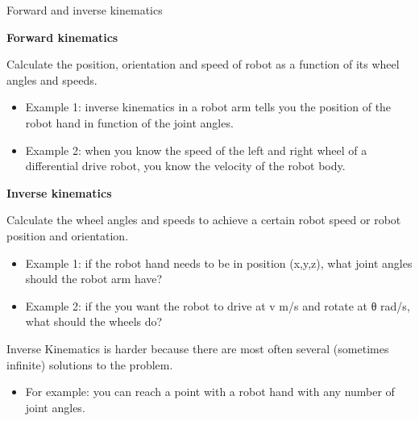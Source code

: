 \documentclass[compress]{beamer}
\begin{document}
\begin{frame}{Forward and inverse kinematics}

\textbf{Forward kinematics}

Calculate the position, orientation and speed of robot as a function of
its wheel angles and speeds.

\begin{itemize}
    \item Example 1: inverse kinematics in a robot arm tells you the position of
  the robot hand in function of the joint angles.
    \item Example 2: when you know the speed of the left and right wheel of a
  differential drive robot, you know the velocity of the robot body.
\end{itemize}

\textbf{Inverse kinematics}

Calculate the wheel angles and speeds to achieve a certain robot speed
or robot position and orientation.

\begin{itemize}
    \item Example 1: if the robot hand needs to be in position (x,y,z), what
  joint angles should the robot arm have?
    \item Example 2: if the you want the robot to drive at v m/s and rotate at θ
  rad/s, what should the wheels do?
\end{itemize}

    \alert{Inverse Kinematics is harder because there are most often several
    (sometimes infinite) solutions to the problem.}

\begin{itemize}
    \item For example: you can reach a point with a robot hand with any number
  of joint angles.
\end{itemize}

\end{frame}
\end{document}
